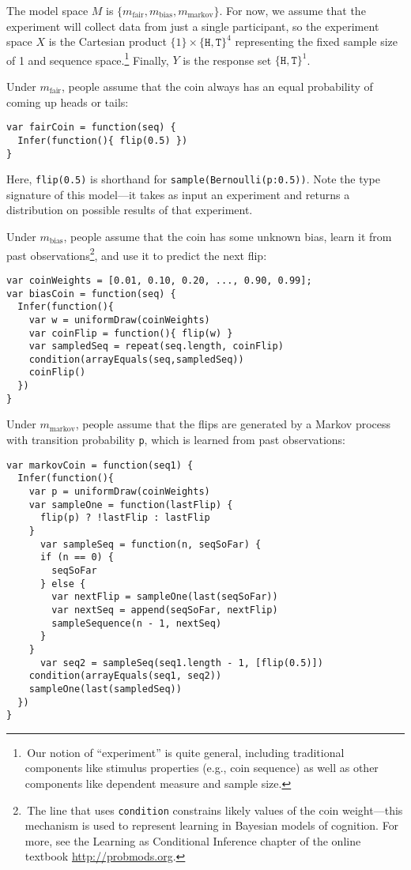 \documentclass[10pt,letterpaper]{article}
\begin{document}
The model space $M$ is $\{m_{\text{fair}}, m_{\text{bias}}, m_{\text{markov}}\}$.
For now, we assume that the experiment will collect data from just a single participant, so the experiment space $X$ is the Cartesian product $\{1\} \times \{\texttt{H}, \texttt{T}\}^4$ representing the fixed sample size of 1 and sequence space.\footnote{\,Our notion of ``experiment'' is quite general, including traditional components like stimulus properties (e.g., coin sequence) as well as other components like dependent measure and sample size.}
Finally, $Y$ is the response set $\{\texttt{H}, \texttt{T}\}^1$.

Under $m_{\text{fair}}$, people assume that the coin always has an equal probability of coming up heads or tails:
\begin{lstlisting}[upquote=true]
var fairCoin = function(seq) {
  Infer(function(){ flip(0.5) })
}
\end{lstlisting}
Here, \texttt{flip(0.5)} is shorthand for \texttt{sample(Bernoulli({p:0.5}))}.
Note the type signature of this model---it takes as input an experiment and returns a distribution on possible results of that experiment.

Under $m_{\text{bias}}$, people assume that the coin has some unknown bias, learn it from past observations\footnote{\,The line that uses \texttt{condition} constrains likely values of the coin weight---this mechanism is used to represent learning in Bayesian models of cognition. For more, see the Learning as Conditional Inference chapter of the online textbook \url{http://probmods.org}.}, and use it to predict the next flip:
\begin{lstlisting}[upquote=true]
var coinWeights = [0.01, 0.10, 0.20, ..., 0.90, 0.99];
var biasCoin = function(seq) {
  Infer(function(){
    var w = uniformDraw(coinWeights)
    var coinFlip = function(){ flip(w) }
    var sampledSeq = repeat(seq.length, coinFlip)
    condition(arrayEquals(seq,sampledSeq))
    coinFlip()
  })
}
\end{lstlisting}
Under $m_{\text{markov}}$, people assume that the flips are generated by a Markov process with transition probability \texttt{p}, which is learned from past observations:

\begin{lstlisting}
var markovCoin = function(seq1) {
  Infer(function(){
    var p = uniformDraw(coinWeights)
    var sampleOne = function(lastFlip) {
      flip(p) ? !lastFlip : lastFlip
    }
	  var sampleSeq = function(n, seqSoFar) {
      if (n == 0) {
        seqSoFar
      } else {
        var nextFlip = sampleOne(last(seqSoFar))
        var nextSeq = append(seqSoFar, nextFlip)
        sampleSequence(n - 1, nextSeq)
      }
    }
	  var seq2 = sampleSeq(seq1.length - 1, [flip(0.5)])
    condition(arrayEquals(seq1, seq2))
    sampleOne(last(sampledSeq))
  })
}
\end{lstlisting}
\end{document}
